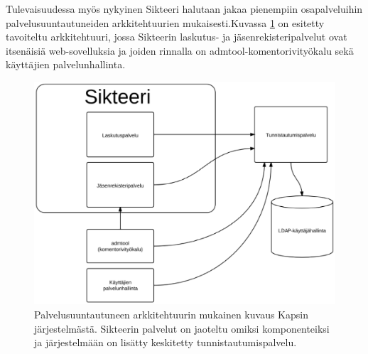 Tulevaisuudessa myös nykyinen Sikteeri halutaan jakaa pienempiin osapalveluihin palvelusuuntautuneiden arkkitehtuurien mukaisesti.Kuvassa \ref{kapsi_uusi} on esitetty tavoiteltu arkkitehtuuri, jossa Sikteerin laskutus- ja jäsenrekisteripalvelut ovat itsenäisiä web-sovelluksia ja joiden rinnalla on admtool-komentorivityökalu sekä käyttäjien palvelunhallinta.

\begin{figure}[ht]
\centering
\includegraphics[width=.7\textwidth]{toteutus/kapsi_uusi.eps}
\caption{Palvelusuuntautuneen arkkitehtuurin mukainen kuvaus Kapsin järjestelmästä. Sikteerin palvelut on jaoteltu omiksi komponenteiksi ja järjestelmään on lisätty keskitetty tunnistautumispalvelu.}%
\label{kapsi_uusi}
\end{figure}